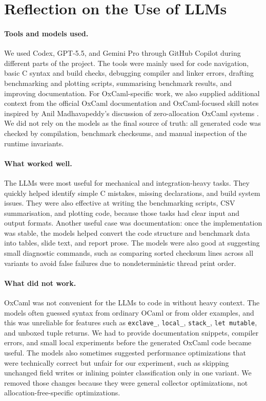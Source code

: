 \documentclass[11pt,a4paper]{article}
\begin{document}
\section{Reflection on the Use of LLMs}
\label{sec:llm}

\paragraph{Tools and models used.}
We used Codex, GPT-5.5, and Gemini Pro through GitHub Copilot during different
parts of the project.  The tools were mainly used for code navigation, basic C
syntax and build checks, debugging compiler and linker errors, drafting
benchmarking and plotting scripts, summarising benchmark results, and improving
documentation.  For OxCaml-specific work, we also supplied additional context
from the official OxCaml documentation and OxCaml-focused skill notes inspired
by Anil Madhavapeddy's discussion of zero-allocation OxCaml systems
\cite{madhavapeddyOxCamlHttpz}.  We did not rely on the models as the final
source of truth: all generated code was checked by compilation, benchmark
checksums, and manual inspection of the runtime invariants.

\paragraph{What worked well.}
The LLMs were most useful for mechanical and integration-heavy tasks.  They
quickly helped identify simple C mistakes, missing declarations, and build
system issues.  They were also effective at writing the benchmarking scripts,
CSV summarisation, and plotting code, because those tasks had clear input and
output formats.  Another useful case was documentation: once the implementation
was stable, the models helped convert the code structure and benchmark data into
tables, slide text, and report prose.  The models were also good at suggesting
small diagnostic commands, such as comparing sorted checksum lines across all
variants to avoid false failures due to nondeterministic thread print order.

\paragraph{What did not work.}
OxCaml was not convenient for the LLMs to code in without heavy context.  The
models often guessed syntax from ordinary OCaml or from older examples, and this
was unreliable for features such as \texttt{exclave\_}, \texttt{local\_},
\texttt{stack\_}, \texttt{let mutable}, and unboxed tuple returns.  We had to
provide documentation snippets, compiler errors, and small local experiments
before the generated OxCaml code became useful.  The models also sometimes
suggested performance optimizations that were technically correct but unfair for
our experiment, such as skipping unchanged field writes or inlining pointer
classification only in one variant.  We removed those changes because they were
general collector optimizations, not allocation-free-specific optimizations.
\end{document}
